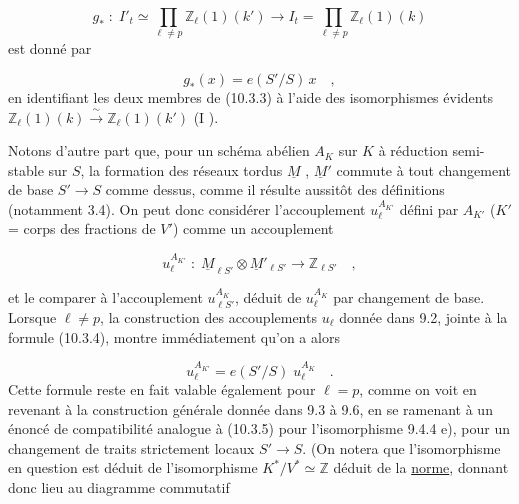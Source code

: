\begin{equation}\tag{10.3.3}
g_* \; : \; I'_t \simeq \prod_{\ell \neq p} \mathbb{Z}_\ell(1)(k') \longrightarrow I_t = \prod_{\ell \neq p} \mathbb{Z}_\ell(1)(k)
\end{equation}
est donné par

\begin{equation}\tag{10.3.4}
g_*(x) = e(S'/S)\, x \quad ,
\end{equation}
en identifiant les deux membres de (10.3.3) à l'aide des isomorphismes évidents $\mathbb{Z}_\ell(1)(k) \xrightarrow{\ \sim\ } \mathbb{Z}_\ell(1)(k')$ (I \qquad ).

Notons d'autre part que, pour un schéma abélien $A_K$ sur $K$ à réduction semi-stable sur $S$, la formation des réseaux tordus $\underline{M}$ , $\underline{M}'$ commute à tout changement de base $S' \longrightarrow S$ comme dessus, comme il résulte aussitôt des définitions (notamment 3.4). On peut donc considérer l'accouplement $u_\ell^{A_{K'}}$ défini par $A_{K'}$ ($K'$ = corps des fractions de $V'$) comme un accouplement

\begin{equation*}
u_\ell^{A_{K'}} \; : \; \underline{M}_{\ell S'} \otimes \underline{M}'_{\ell S'} \longrightarrow \mathbb{Z}_{\ell S'} \quad ,
\end{equation*}


et le comparer à l'accouplement $u_{\ell S'}^{A_K}$, déduit de $u_\ell^{A_K}$ par changement de base. Lorsque $\ell \neq p$, la construction des accouplements $u_\ell$ donnée dans 9.2, jointe à la formule (10.3.4), montre immédiatement qu'on a alors

\begin{equation}\tag{10.3.5}
u_\ell^{A_{K'}} = e(S'/S) \; u_\ell^{A_K} \quad .
\end{equation}
Cette formule reste en fait valable également pour $\ell = p$, comme on voit en revenant à la construction générale donnée dans 9.3 à 9.6, en se ramenant à un énoncé de compatibilité analogue à (10.3.5) pour l'isomorphisme 9.4.4 e), pour un changement de traits strictement locaux $S' \longrightarrow S$. (On notera que l'isomorphisme en question est déduit de l'isomorphisme $K^*/V^* \simeq \mathbb{Z}$ déduit de la \underline{norme}, donnant donc lieu au diagramme commutatif

